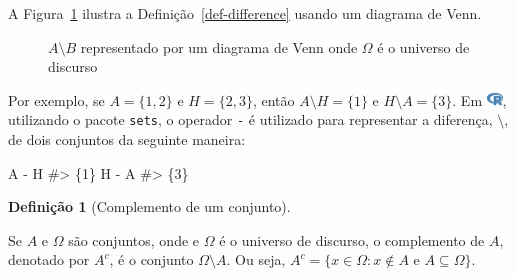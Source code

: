 \documentclass[
  letterpaper,
]{book}
\newenvironment{Shaded}{\begin{snugshade}}{\end{snugshade}}
\newcommand{\CommentTok}[1]{\textcolor[rgb]{0.37,0.37,0.37}{#1}}
\newcommand{\NormalTok}[1]{\textcolor[rgb]{0.00,0.23,0.31}{#1}}
\newcommand{\SpecialCharTok}[1]{\textcolor[rgb]{0.37,0.37,0.37}{#1}}
\theoremstyle{definition}
\newtheorem{definition}{Definição}[chapter]
\theoremstyle{plain}
\theoremstyle{remark}
\begin{document}
A Figura~\ref{fig-difference-venn-diagram} ilustra a
Definição~\ref{def-difference} usando um diagrama de Venn.

\begin{figure}


\caption{\label{fig-difference-venn-diagram}\(A \setminus B\)
representado por um diagrama de Venn onde \(\Omega\) é o universo de
discurso}

\end{figure}%

Por exemplo, se \(A = \{ 1, 2 \}\) e \(H = \{ 2, 3 \}\), então
\(A \setminus H = \{ 1 \}\) e \(H \setminus A = \{ 3 \}\). Em
\includegraphics[width=1.13em,height=1em]{naive_set_theory_files/figure-pdf/fa-icon-9b00320707d42527dde67262afb33ded.pdf},
utilizando o pacote \texttt{sets}, o operador \texttt{-} é utilizado
para representar a diferença, \(\setminus\), de dois conjuntos da
seguinte maneira:

\begin{Shaded}
\begin{Highlighting}[]
\NormalTok{A }\SpecialCharTok{{-}}\NormalTok{ H}
\CommentTok{\#\textgreater{} \{1\}}
\NormalTok{H }\SpecialCharTok{{-}}\NormalTok{ A}
\CommentTok{\#\textgreater{} \{3\}}
\end{Highlighting}
\end{Shaded}

\begin{definition}[Complemento de um
conjunto]\protect\hypertarget{def-complement}{}\label{def-complement}

Se \(A\) e \(\Omega\) são conjuntos, onde e \(\Omega\) é o universo de
discurso, o complemento de \(A\), denotado por \(A^c\), é o conjunto
\(\Omega \setminus A\). Ou seja,
\(A^c = \{x \in \Omega: x \notin A \text{ e } A \subseteq \Omega \}\).

\end{definition}
\end{document}
